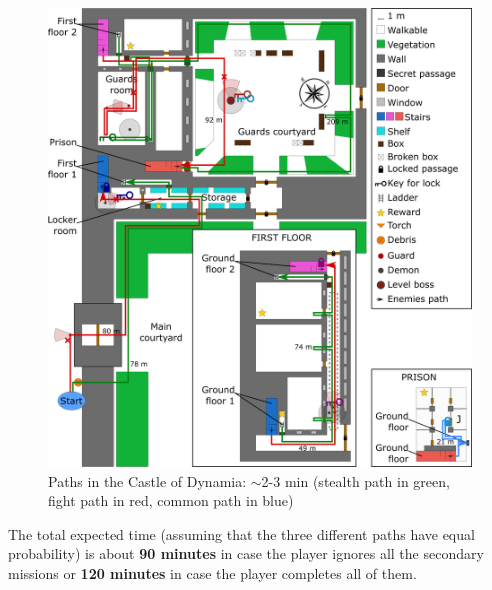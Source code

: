 \begin{figure}[H]
    \centering
	\includegraphics[width=\textwidth]{Images/Diagrams/castleOfDynamiaPaths.png}
	\caption{Paths in the Castle of Dynamia: $\sim$2-3 min (stealth path in green, fight path in red, common path in blue)}
\end{figure}

The total expected time (assuming that the three different paths have equal probability) is about \textbf{90 minutes} in case the player ignores all the secondary missions or \textbf{120 minutes} in case the player completes all of them.
